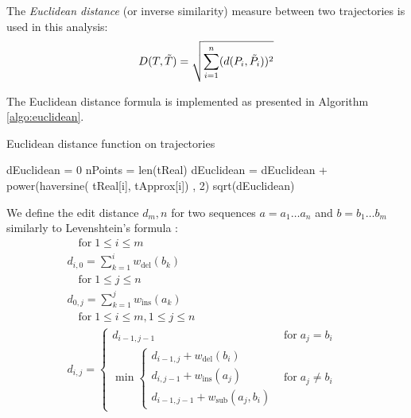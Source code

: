 The \textit{Euclidean distance} (or inverse similarity) measure between two trajectories is used in this analysis:
\[D(T,\Tilde{T}) = \sqrt{\sum_{i=1}^{n} (d(P_{i},\Tilde{P_{i}}))^{2}}\]

The Euclidean distance formula is implemented as presented in Algorithm \ref{algo:euclidean}.

\begin{algorithm}
\begin{algorithmic}
\caption{Euclidean distance function on trajectories} \label{algo:euclidean}
\State dEuclidean = 0
\State nPoints = len(tReal) 
    \State dEuclidean = dEuclidean + power(haversine(     
    \State tReal[i], tApprox[i]) , 2)
\EndFor
\Return sqrt(dEuclidean)
\EndFunction
\end{algorithmic}
\end{algorithm}

We define the edit distance $d_m,n$ for two sequences $a = a_1\ldots a_n$ and $b = b_1\ldots b_m$ similarly to Levenshtein's formula \cite{edit_dist}:
\[
\begin{aligned}
\quad {\text{for}}\;1\leq i\leq m \\
d_{{i,0}}=\sum _{{k=1}}^{{i}}w_{{\mathrm  {del}}}(b_{{k}}) \\
\quad {\text{for}}\;1\leq j\leq n & \\
d_{{0,j}}=\sum _{{k=1}}^{{j}}w_{{\mathrm  {ins}}}(a_{{k}}) \\
\quad {\text{for}}\;1\leq i\leq m,1\leq j\leq n \\
d_{{i,j}}={\begin{cases}d_{{i-1,j-1}}&{\text{for}}\;a_{{j}}=b_{{i}}\\
\min {\begin{cases}d_{{i-1,j}}+w_{{\mathrm  {del}}}(b_{{i}})\\d_{{i,j-1}}+w_{{\mathrm  {ins}}}(a_{{j}})\\d_{{i-1,j-1}}+w_{{\mathrm  {sub}}}(a_{{j}},b_{{i}})\end{cases}}&{\text{for}}\;a_{{j}}\neq b_{{i}}\end{cases}} 
\end{aligned}
\]

